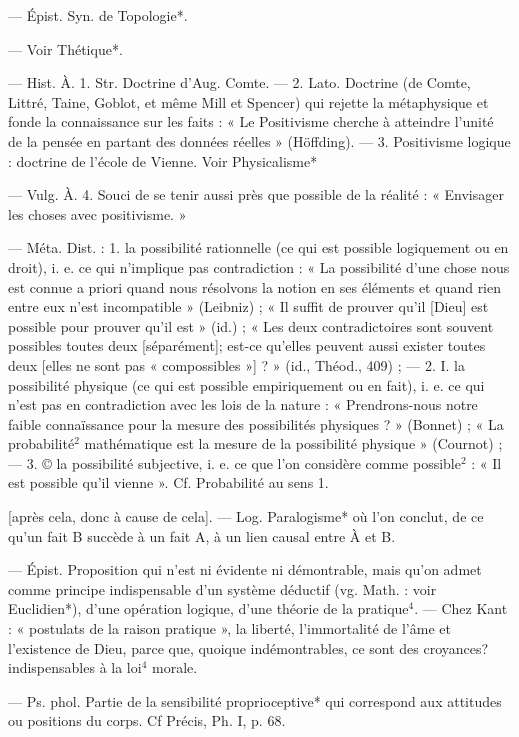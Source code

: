 \begin{itemize}[leftmargin=1cm, label=, itemsep=1pt]
 — Épist.
Syn. de Topologie*.

 — Voir Thétique*.

 — Hist. À. 1. Str. Doctrine d'Aug. Comte. — 2. Lato.
Doctrine (de Comte, Littré, Taine,
Goblot, et même Mill et Spencer)
qui rejette la métaphysique et fonde
la connaissance sur les faits : « Le
Positivisme cherche à atteindre
l’unité de la pensée en partant des
données réelles » (Höffding). —
3. Positivisme logique : doctrine de
l’école de Vienne. Voir Physicalisme*

— Vulg. À. 4. Souci de se tenir
aussi près que possible de la réalité :
« Envisager les choses avec positivisme. »

 — Méta. Dist. :
1. la possibilité rationnelle (ce qui
est possible logiquement ou en droit),
i. e. ce qui n'implique pas contradiction : « La possibilité d’une chose
nous est connue a priori quand nous
résolvons la notion en ses éléments
et quand rien entre eux n’est incompatible » (Leibniz) ; « Il suffit de
prouver qu'il [Dieu] est possible
pour prouver qu’il est » (id.) ; « Les
deux contradictoires sont souvent
possibles toutes deux [séparément];
est-ce qu'elles peuvent aussi exister
toutes deux [elles ne sont pas « compossibles »] ? » (id., Théod., 409) ; —
2. I. la possibilité physique (ce qui
est possible empiriquement ou en
fait), i. e. ce qui n’est pas en contradiction avec les lois de la nature :
« Prendrons-nous notre faible connaïssance pour la mesure des possibilités physiques ? » (Bonnet) ; « La
probabilité$^2$ mathématique est la
mesure de la possibilité physique »
(Cournot) ; — 3. © la possibilité
subjective, i. e. ce que l’on considère
comme possible$^2$ : « Il est possible
qu'il vienne ». Cf. Probabilité au
sens 1.

 [après cela,
donc à cause de cela]. — Log. Paralogisme* où l’on conclut, de ce qu’un
fait B succède à un fait A, à un lien
causal entre À et B.

 — Épist. Proposition qui
n’est ni évidente ni démontrable,
mais qu’on admet comme principe
indispensable d'un système déductif
(vg. Math. : voir Euclidien*), d’une
opération logique, d’une théorie de
la pratique$^4$. — Chez Kant : « postulats de la raison pratique », la liberté, l’immortalité de l'âme et
l’existence de Dieu, parce que,
quoique indémontrables, ce sont des
croyances? indispensables à la loi$^4$
morale.

 — Ps. phol.
Partie de la sensibilité proprioceptive* qui correspond aux attitudes
ou positions du corps. Cf Précis,
Ph. I, p. 68.


\end{itemize}
